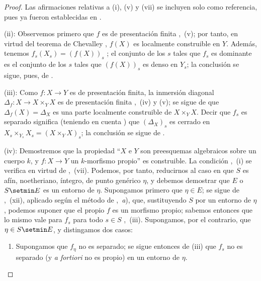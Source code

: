 \begin{proof}
Las afirmaciones relativas a (i), (v) y (vii) se incluyen solo como referencia, pues ya fueron establecidas en .

(ii): Observemos primero que $f$ es de presentación finita ,~(v); por tanto, en virtud del teorema de Chevalley , $f(X)$ es localmente construible en $Y$.
Además, tenemos $f_s(X_s)=(f(X))_s$ ; el conjunto de los $s$ tales que $f_s$ es dominante es el conjunto de los $s$ tales que $(f(X))_s$ es denso en $Y_s$; la conclusión se sigue, pues, de .

(iii): Como $f:X\to Y$ es de presentación finita, la inmersión diagonal $\Delta_f:X\to X\times_Y X$ es de presentación finita ,~(iv) y (v); se sigue de  que $\Delta_f(X)=\Delta_X$ es una parte localmente construible de $X\times_Y X$.
Decir que $f_s$ es separado significa (teniendo en cuenta ) que $(\Delta_X)_s$ es cerrado en $X_s\times_{Y_s} X_s=(X\times_Y X)_s$; la conclusión se sigue de .


(iv): Demostremos que la propiedad ``$X$ e $Y$ son preesquemas algebraicos sobre un cuerpo $k$, y $f:X\to Y$ un $k$-morfismo propio'' es construible.
La condición ,~(i) se verifica en virtud de ,~(vii).
Podemos, por tanto, reducirnos al caso en que $S$ es afín, noetheriano, íntegro, de punto genérico $\eta$, y debemos demostrar que $E$ o $S\setmin E$ es un entorno de $\eta$.
Supongamos primero que $\eta\in E$; se sigue de ,~(xii), aplicado según el método de ,~\emph{a}), que, sustituyendo $S$ por un entorno de $\eta$, podemos
suponer que el propio $f$ es un morfismo propio; sabemos entonces que lo mismo vale para $f_s$ para todo $s\in S$ ,~(iii).
Supongamos, por el contrario, que $\eta\in S\setmin E$, y distingamos dos casos:
\begin{enumerate}[label=\upshape{$\arabic{enumi}^\circ$}]
  \item Supongamos que $f_\eta$ no es separado; se sigue entonces de (iii) que $f_s$ no es separado (y \emph{a fortiori} no es propio) en un entorno de $\eta$.


\end{enumerate}
\end{proof}
